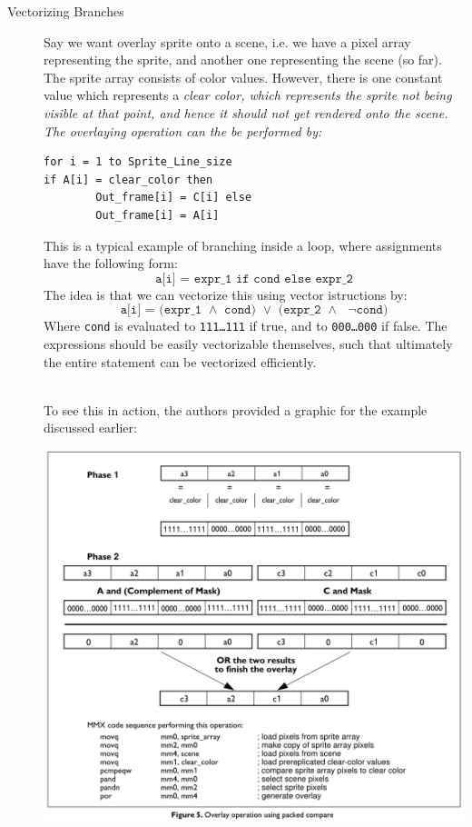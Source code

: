 \documentclass[../../main.tex]{subfiles}
\begin{document}
\begin{description}
    \item[Vectorizing Branches] Say we want overlay sprite onto a scene, i.e. we have a pixel array representing the sprite, and another one representing the scene (so far). The sprite array consists of color values. However, there is one constant value which represents a \em clear color\em , which represents the sprite not being visible at that point, and hence it should not get rendered onto the scene. The overlaying operation can the be performed by:
    \begin{lstlisting}
for i = 1 to Sprite_Line_size
if A[i] = clear_color then
        Out_frame[i] = C[i] else
        Out_frame[i] = A[i]
    \end{lstlisting}

    This is a typical example of branching inside a loop, where assignments have the following form:
    \[
        \texttt{a[i] = expr\_1 if cond else expr\_2}
    \]
    The idea is that we can vectorize this using vector istructions by:
    \[
        \texttt{a[i] = (expr\_1 $\land$ cond) $\lor$ (expr\_2 $\land$ $\lnot$cond)}
    \]
    Where \texttt{cond} is evaluated to \texttt{111\dots111} if true, and to \texttt{000\dots000} if false. The expressions should be easily vectorizable themselves, such that ultimately the entire statement can be vectorized efficiently.

    ~\\
    To see this in action, the authors provided a graphic for the example discussed earlier:

    \includegraphics[width=\textwidth]{Chapters/07/vectorizing_branches.png}


\end{description}
\end{document}
